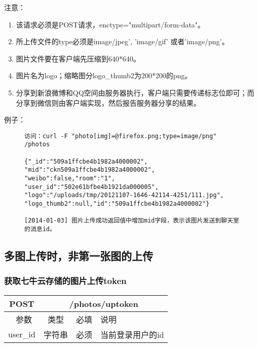 注意：

\begin{enumerate}
\item 该请求必须是POST请求，enctype="multipart/form-data"。
\item 所上传文件的type必须是image/jpeg', 'image/gif' 或者'image/png'。
\item 图片文件要在客户端先压缩到640*640。
\item 图片名为logo；缩略图分logo\_thumb2为200*200的png。
\item 分享到新浪微博和QQ空间由服务器执行，客户端只需要传递标志位即可；而分享到微信则由客户端实现，然后报告服务器分享的结果。
\end{enumerate}

例子：

\begin{figure}[H]
\begin{verbatim}
访问：curl -F "photo[img]=@firefox.png;type=image/png" 
/photos

{"_id":"509a1ffcbe4b1982a4000002",
"mid":"ckn509a1ffcbe4b1982a4000002",
"weibo":false,"room":"1",
"user_id":"502e61bfbe4b1921da000005",
"logo":"/uploads/tmp/20121107-1646-42114-4251/111.jpg",
"logo_thumb2":null,"id":"509a1ffcbe4b1982a4000002"}

[2014-01-03] 图片上传成功返回值中增加mid字段，表示该图片发送到聊天室的消息id。

\end{verbatim}
\end{figure}



\subsection{多图上传时，非第一张图的上传}

\subsubsection{获取七牛云存储的图片上传token}

\begin{table}[H]
   \begin{center}
\begin{tabular}{|c|c|c|p{12cm}|}
\hline
POST & \multicolumn{3}{|c|}{/photos/uptoken} \\
\hline\hline
 \  参数  & 类型 & 必填 &  说明  \\
\hline
 user\_id  & 字符串 & 必须 &  当前登录用户的id\\
 \hline
\end{tabular}
   \end{center}
\end{table}

